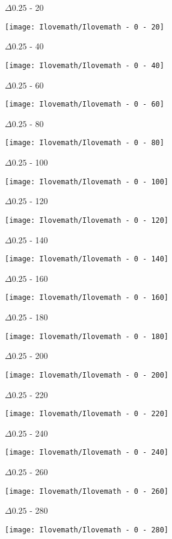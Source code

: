 \begin{enumerate}
    \begin{multicols}{4}
    \begin{center}
    $\Delta 0.25$ - 20

    \texttt{[image: Ilovemath/Ilovemath - 0 - 20]}

    $\Delta 0.25$ - 40

    \texttt{[image: Ilovemath/Ilovemath - 0 - 40]}

    $\Delta 0.25$ - 60

    \texttt{[image: Ilovemath/Ilovemath - 0 - 60]}

    $\Delta 0.25$ - 80

    \texttt{[image: Ilovemath/Ilovemath - 0 - 80]}

    $\Delta 0.25$ - 100

    \texttt{[image: Ilovemath/Ilovemath - 0 - 100]}

    $\Delta 0.25$ - 120

    \texttt{[image: Ilovemath/Ilovemath - 0 - 120]}

    $\Delta 0.25$ - 140

    \texttt{[image: Ilovemath/Ilovemath - 0 - 140]}

    $\Delta 0.25$ - 160

    \texttt{[image: Ilovemath/Ilovemath - 0 - 160]}

    $\Delta 0.25$ - 180

    \texttt{[image: Ilovemath/Ilovemath - 0 - 180]}

    $\Delta 0.25$ - 200

    \texttt{[image: Ilovemath/Ilovemath - 0 - 200]}

    $\Delta 0.25$ - 220

    \texttt{[image: Ilovemath/Ilovemath - 0 - 220]}

    $\Delta 0.25$ - 240

    \texttt{[image: Ilovemath/Ilovemath - 0 - 240]}
  \end{center}
\end{multicols}
  \newpage
  \begin{multicols}{4}
  \begin{center}
    $\Delta 0.25$ - 260

    \texttt{[image: Ilovemath/Ilovemath - 0 - 260]}

    $\Delta 0.25$ - 280

    \texttt{[image: Ilovemath/Ilovemath - 0 - 280]}


\end{center}
\end{multicols}
\end{enumerate}
